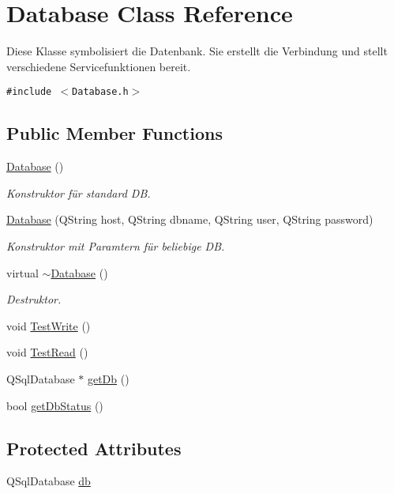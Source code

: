 \hypertarget{class_database}{
\section{Database Class Reference}
\label{class_database}
}
Diese Klasse symbolisiert die Datenbank. Sie erstellt die Verbindung und stellt verschiedene Servicefunktionen bereit.  


{\tt \#include $<$Database.h$>$}

\subsection*{Public Member Functions}
\begin{CompactItemize}
\item 
\hyperlink{class_database_4703c80e6969d33565ea340f768fdadf}{Database} ()
\begin{CompactList}\small\item\em Konstruktor für standard DB. \item\end{CompactList}\item 
\hyperlink{class_database_00afd5df356bd7a1f65f7e5f097486ae}{Database} (QString host, QString dbname, QString user, QString password)
\begin{CompactList}\small\item\em Konstruktor mit Paramtern für beliebige DB. \item\end{CompactList}\item 
virtual \hyperlink{class_database_84d399a2ad58d69daab9b05330e1316d}{$\sim$Database} ()
\begin{CompactList}\small\item\em Destruktor. \item\end{CompactList}\item 
void \hyperlink{class_database_e2ef309eea700ffc9c6339b6cb6ee37c}{TestWrite} ()
\item 
void \hyperlink{class_database_d399b899bae6d747b8cb0108f1cb188b}{TestRead} ()
\item 
QSqlDatabase $\ast$ \hyperlink{class_database_b480eca23d1bf71206cab822da9b0246}{getDb} ()
\item 
bool \hyperlink{class_database_2ba851b65f3382496d35cd70de21bfff}{getDbStatus} ()
\end{CompactItemize}
\subsection*{Protected Attributes}
\begin{CompactItemize}
\item 
QSqlDatabase \hyperlink{class_database_ea64d7d99483faec8f049cdd817bb693}{db}
\end{CompactItemize}


